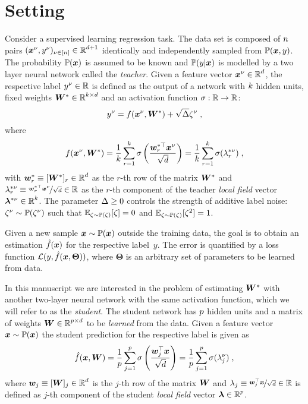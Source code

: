 \documentclass[10pt]{article}
\begin{document}
\section{Setting}
Consider a supervised learning regression task. The data set is composed of $n$ pairs $ (\bm{x}^\nu , y^\nu)_{\nu \in [n]} \in \operatorname{\mathbb{R}}^{d + 1} $ identically and independently sampled from $ \operatorname{\mathbb{P}} (\bm{x} , y)$. The probability $ \operatorname{\mathbb{P}} (\bm{x}) $  is assumed to be known and $ \operatorname{\mathbb{P}} (y | \bm{x}) $ is modelled by a two layer neural network called the {\it teacher}. Given a feature vector $\bm{x}^\nu \in \operatorname{\mathbb{R}}^d$, the respective label $ y^{\nu} \in \operatorname{\mathbb{R}}$ is defined as the output of a network with $k$ hidden units, fixed weights $ \bm{W}^* \in \operatorname{\mathbb{R}}^{ k \times d }$ and an activation function $\sigma : \operatorname{\mathbb{R}} \rightarrow \operatorname{\mathbb{R}}$:
\begin{equation}
    y^\nu = f ( \bm{x}^\nu  , \bm{W}^* )  + \sqrt{\Delta} \zeta^\nu   \;,
\end{equation}
where \begin{equation}
    f ( \bm{x}^\nu , \bm{W}^* ) = \frac{1}{k} \sum_{r=1}^{k}  \sigma \left( \frac{\bm{w}_{r}^{*\top} \bm{x}^\nu}{\sqrt{d}}  \right) = \frac{1}{k}
     \sum_{r=1}^{k} \sigma ( \lambda_{r}^{*\nu}    ) \;,
\end{equation}
with $\bm{w}_{r}^* \equiv [\bm{W}^* ]_r \in \operatorname{\mathbb{R}}^d$ as the $r$-th row of the matrix $\bm{W}^*$ and $\lambda^{*\nu}_{r} \equiv \nicefrac{\bm{w}_{r}^{*\top} \bm{x}^\nu}{\sqrt{d}} \in \operatorname{\mathbb{R}}  $ as the $r$-th component of the teacher {\it local field} vector $ \bm{\lambda}^{*\nu} \in \operatorname{\mathbb{R}}^k $. The parameter $\Delta \ge 0$ controls the strength of additive label noise: $\zeta^\nu  \sim \operatorname{\mathbb{P}} ( \zeta^\nu) $ such that $ \operatorname{\mathbb{E}}_{\zeta \sim \operatorname{\mathbb{P}} (\zeta)} [\zeta] = 0  $ and $ \operatorname{\mathbb{E}}_{\zeta \sim \operatorname{\mathbb{P}} (\zeta)} [\zeta^2] = 1$.

Given a new sample $ \bm{x} \sim \operatorname{\mathbb{P}} (\bm{x}) $ outside the training data, the goal is to obtain an estimation $\hat{f} ( \bm{x} )$ for the respective label~$y$. The error is quantified by a loss function ${\cal L} ( y , \hat{f} ( \bm{x}, \bm{\Theta} ) )$, where $\bm{\Theta}$ is an arbitrary set of parameters to be learned from data.

In this manuscript we are interested in the problem of estimating $\bm{W}^*$ with another two-layer neural network with the same activation function, which we will refer to as the {\it student}. The student network has $p$ hidden units and a matrix of weights $\bm{W} \in \operatorname{\mathbb{R}}^{p \times d}$ to be {\it learned} from the data. Given a feature vector $\bm{x} \sim \operatorname{\mathbb{P}} (\bm{x})$ the student prediction for the respective label is given as
\begin{equation}
   \hat{f} ( \bm{x} , \bm{W}) = \frac{1}{p}  \sum_{j=1}^{p} \sigma \left( \frac{\bm{w}_{j}^\top \bm{x}}{\sqrt{d}}  \right) =   \frac{1}{p} \sum_{j=1}^{p} \sigma ( \lambda^\nu_j )\;,
\end{equation}
where $\bm{w}_{j} \equiv [\bm{W}]_j \in \operatorname{\mathbb{R}}^d$ is the $j$-th row of the matrix $\bm{W}$ and $\lambda_{j} \equiv \nicefrac{\bm{w}_{j}^\top \bm{x}}{\sqrt{d}} \in \operatorname{\mathbb{R}} $ is defined as $j$-th component of the student {\it local field} vector $ \bm{\lambda} \in \operatorname{\mathbb{R}}^p $.
\end{document}
